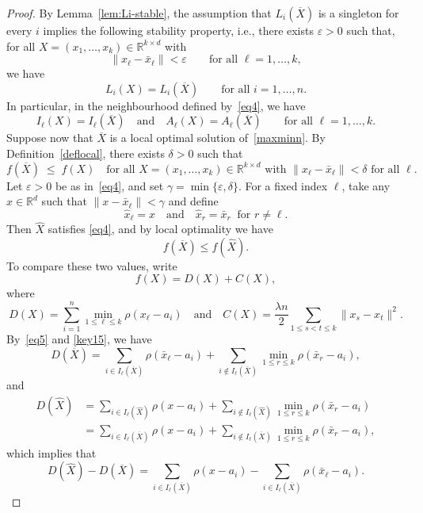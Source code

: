 \documentclass[10pt,a4paper]{amsart}
\def\Bar{\overline}
\newcommand{\R}{\mathbb{R}}
\begin{document}
\begin{proof}
By Lemma~\ref{lem:Li-stable}, the assumption that $L_i(\Bar X)$ is a singleton
for every $i$ implies the following stability property, i.e., there exists
$\varepsilon>0$ such that, for all $X=(x_1,\dots,x_k)\in\R^{k\times d}$ with
\begin{equation}\label{eq4}
\|x_\ell-\bar x_\ell\|<\varepsilon\qquad\text{for all }\ell=1,\dots,k,
\end{equation}
we have
\begin{equation}\label{eq5}
L_i(X)=L_i(\Bar X)\qquad\text{for all }i=1,\dots,n.
\end{equation}
In particular, in the neighbourhood defined by~\eqref{eq4}, we have
\begin{equation}\label{key15}
    I_\ell(X)=I_\ell(\Bar X)
\quad\text{and}\quad
A_\ell(X)=A_\ell(\Bar X)
\qquad\text{for all }\ell=1,\dots,k.
\end{equation}
Suppose now that $\Bar X$ is a local optimal solution of~\eqref{maxminn}. 
By Definition~\ref{deflocal}, there exists $\delta>0$ such that
\[
f(\Bar X)\;\le\;f(X)
\quad
\text{for all }X=(x_1,\dots,x_k)\in\R^{k\times d}
\text{ with }\|x_\ell-\bar x_\ell\|<\delta
\text{ for all }\ell.
\]
Let $\varepsilon>0$ be as in~\eqref{eq4}, and set $
\gamma = \min\{\varepsilon,\delta\}.$
 For a fixed index $\ell$, take any $x\in\mathbb{R}^d$ such that $\|x-\bar x_\ell\| < \gamma$ and define 
 \[
\widehat x_\ell = x
\quad\text{and}\quad
\widehat x_r = \bar x_r \ \text{ for } r\neq\ell.
\]
Then $\widehat X$ satisfies \eqref{eq4}, and by local optimality we have
\begin{equation}\label{eq6}
f(\Bar X)\le f(\widehat X).
\end{equation}
To compare these two values, write
\begin{equation}\label{fDC}
f(X)=D(X)+C(X),    
\end{equation}
where
\[
D(X)=\sum_{i=1}^n\min_{1\le \ell\le k}\rho(x_\ell-a_i)
\quad\text{and}\quad
C(X)=\frac{\lambda n}{2}\sum_{1\le s<t\le k}\|x_s-x_t\|^2.
\]
 By~\eqref{eq5} and \eqref{key15}, we have
\begin{equation*}\label{eq:D-bar}
D(\Bar X)
=
\sum_{i\in I_\ell(\Bar X)}\rho(\bar x_\ell-a_i)
+
\sum_{i\notin I_\ell(\Bar X)}\min_{1\le r\le k}\rho(\bar x_r-a_i),
\end{equation*}
and
\begin{equation*}\label{eq:D-hat}
\begin{aligned}
     D(\widehat X)
     &=
\sum_{i\in I_\ell(\widehat X)}\rho(x-a_i)
+
\sum_{i\notin I_\ell(\widehat X)}\min_{1\le r\le k}\rho(\bar x_r-a_i) \\
     &=
\sum_{i\in I_\ell(\Bar X)}\rho(x-a_i)
+
\sum_{i\notin I_\ell(\Bar X)}\min_{1\le r\le k}\rho(\bar x_r-a_i),
\end{aligned}
\end{equation*}
which implies that
\begin{equation}\label{eq:D-diff}
D(\widehat X) - D(\Bar X) = \sum_{i\in I_\ell(\Bar X)} \rho(x-a_i) - \sum_{i\in I_\ell(\Bar X)} \rho(\bar x_\ell-a_i).
\end{equation}


\end{proof}
\end{document}
